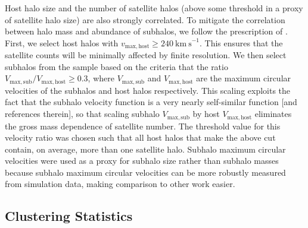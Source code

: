 \documentclass[usenatbib]{mnras}
\begin{document}


Host halo size and the number of satellite halos 
(above some threshold in a proxy of satellite halo size) are also strongly correlated. 
To mitigate the correlation between halo mass and abundance of subhalos, 
we follow the prescription of \citet{wechsler_etal06}. First, we select host halos 
with $v_{\mathrm{max,host}} \ge 240 \ \mathrm{km \ s}^{-1}$. This ensures that the satellite counts 
will be minimally affected by finite resolution. We then select subhalos
from the sample based on the criteria that the ratio $V_{\mathrm{max,sub}}/V_{\mathrm{max,host}} \ge 0.3$, 
where $V_{\mathrm{max,sub}}$ and $V_{\mathrm{max,host}}$ are the maximum circular velocities 
of the subhalos and host halos respectively. This scaling exploits the fact that the subhalo velocity 
function is a very nearly self-similar function \citep{zentner_etal05}[and references therein], 
so that scaling subhalo $V_{\mathrm{max,sub}}$ by host $V_{\mathrm{max,host}}$ 
eliminates the gross mass dependence of satellite number. The threshold value for this velocity ratio was chosen 
such that all host halos that make the above cut contain, on average, more than one satellite halo. 
Subhalo maximum circular velocities were used as a proxy for subhalo size rather than subhalo masses because 
subhalo maximum circular velocities can be more robustly measured from simulation data, making 
comparison to other work easier.


\subsection{Clustering Statistics}
\end{document}
